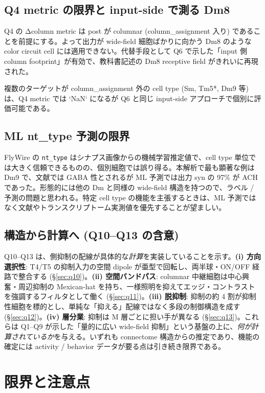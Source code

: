 \documentclass[11pt,a4paper]{ltjsarticle}
\begin{document}
\subsection{Q4 metric の限界と input-side で測る Dm8}

Q4 の Δcolumn metric は post が columnar (column\_assignment 入り) であることを前提にする。よって出力が wide-field 細胞ばかりに向かう Dm8 のような color circuit cell には適用できない。代替手段として Q6 で示した「input 側 column footprint」が有効で、教科書記述の Dm8 receptive field がきれいに再現された。

複数のターゲットが column\_assignment 外の cell type (Sm, Tm5*, Dm9 等) は、Q4 metric では `NaN` になるが Q6 と同じ input-side アプローチで個別に評価可能である。

\subsection{ML nt\_type 予測の限界}

FlyWire の \texttt{nt\_type} はシナプス画像からの機械学習推定値で、cell type 単位では大きく信頼できるものの、個別細胞では誤り得る。本解析で最も顕著な例は Dm9 で、文献では GABA 性とされるが ML 予測では出力 syn の 97\% が ACH であった。形態的には他の Dm と同様の wide-field 構造を持つので、ラベル / 予測の問題と思われる。特定 cell type の機能を主張するときは、ML 予測ではなく文献やトランスクリプトーム実測値を優先することが望ましい。

\subsection{構造から計算へ (Q10--Q13 の含意)}

Q10--Q13 は、側抑制の配線が具体的な\emph{計算}を実装していることを示す。\textbf{(i) 方向選択性}: T4/T5 の抑制入力の空間 dipole が亜型で回転し、両半球・ON/OFF 経路で整合する (\S\ref{sec:q10})。\textbf{(ii) 空間バンドパス}: columnar 中継細胞は中心興奮・周辺抑制の Mexican-hat を持ち、一様照明を抑えてエッジ・コントラストを強調するフィルタとして働く (\S\ref{sec:q11})。\textbf{(iii) 脱抑制}: 抑制の約 4 割が抑制性細胞を標的とし、単純な「抑える」配線ではなく多段の制御構造を成す (\S\ref{sec:q12})。\textbf{(iv) 層分業}: 抑制は M 層ごとに担い手が異なる (\S\ref{sec:q13})。これらは Q1--Q9 が示した「量的に広い wide-field 抑制」という基盤の上に、\emph{何が計算されているか}を与える。いずれも connectome 構造からの推定であり、機能の確定には activity / behavior データが要る点は引き続き限界である。

\section{限界と注意点}\label{sec:limitations}
\end{document}
